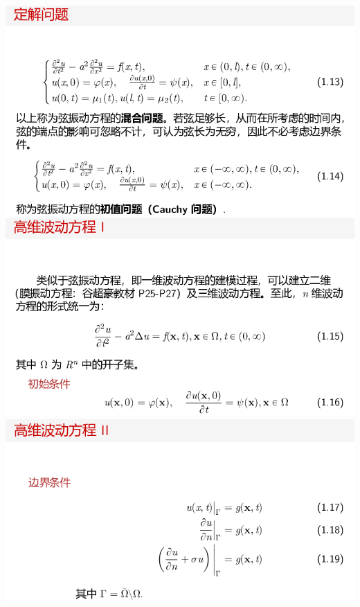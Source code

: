 \documentclass[11pt,a4paper]{ctexart}
\begin{document}
\begin{paracol}{2}
\includegraphics[width=\linewidth]{chap01_24.png}
\includegraphics[width=\linewidth]{chap01_25.png}
\includegraphics[width=\linewidth]{chap01_26.png}
\newpage


\end{paracol}
\end{document}
